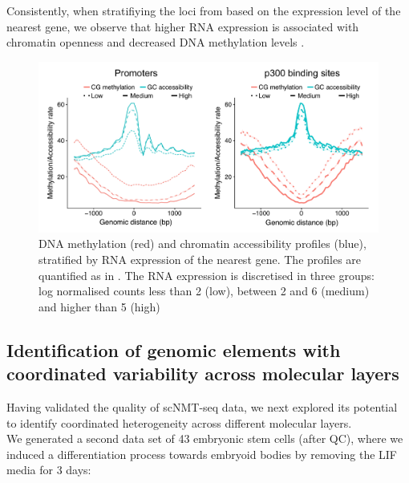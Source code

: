 Consistently, when stratifiying the loci from  based on the expression level of the nearest gene, we observe that higher RNA expression is associated with chromatin openness and decreased DNA methylation levels . 
\begin{figure}[H]
	\centering
	\includegraphics[width=0.9\linewidth]{scNMT_pseudobulk_profiles_byexpr}
	\caption[]{DNA methylation (red) and chromatin accessibility profiles (blue), stratified by RNA expression of the nearest gene. The profiles are quantified as in . The RNA expression is discretised in three groups: log normalised counts less than 2 (low), between 2 and 6 (medium) and higher than 5 (high)}
	\label{fig:scnmt_profiles_byexpr}
\end{figure}

\subsection{Identification of genomic elements with coordinated variability across molecular layers}

Having validated the quality of scNMT-seq data, we next explored its potential to identify coordinated heterogeneity across different molecular layers.\\
We generated a second data set of 43 embryonic stem cells (after QC), where we induced a differentiation process towards embryoid bodies by removing the LIF media for 3 days:

